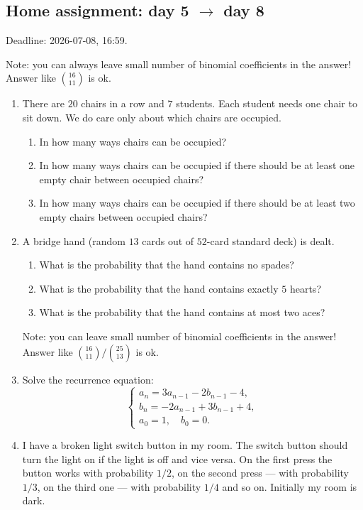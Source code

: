 \documentclass[12pt]{article}
\begin{document}





\subsection*{Home assignment: day 5 $\to$ day 8}

Deadline: 2026-07-08, 16:59. 

Note: you can always leave small number of binomial coefficients in the answer! Answer like $16 \choose 11$ is ok. 

\begin{enumerate}
    \item There are $20$ chairs in a row and $7$ students. Each student needs one chair to sit down. 
We do care only about which chairs are occupied.

\begin{enumerate}[label=\alph*)]
    \item In how many ways chairs can be occupied? 
    \item In how many ways chairs can be occupied if there should be at least one empty chair between occupied chairs?
    \item In how many ways chairs can be occupied if there should be at least two empty chairs between occupied chairs?
\end{enumerate}

    \item A bridge hand (random $13$ cards out of $52$-card standard deck) is dealt. 

\begin{enumerate}[label=\alph*)]
\item What is the probability that the hand contains no spades? 
\item What is the probability that the hand contains exactly $5$ hearts? 
\item What is the probability that the hand contains at most two aces? 
\end{enumerate}

Note: you can leave small number of binomial coefficients in the answer! Answer like ${16 \choose 11}/{25 \choose 13}$ is ok. 

    \item Solve the recurrence equation:
    \[
    \begin{cases}
    a_n = 3a_{n-1} - 2b_{n-1} - 4, \\
    b_n = - 2a_{n-1} + 3b_{n-1} + 4, \\
    a_0 = 1, \quad b_0 = 0.
    \end{cases}
    \]
    \item I have a broken light switch button in my room. 
The switch button should turn the light on if the light is off and vice versa.
On the first press the button works with probability $1/2$, on the second press — with probability $1/3$, on the third one — with probability $1/4$ and so on.
Initially my room is dark.


\end{enumerate}
\end{document}

